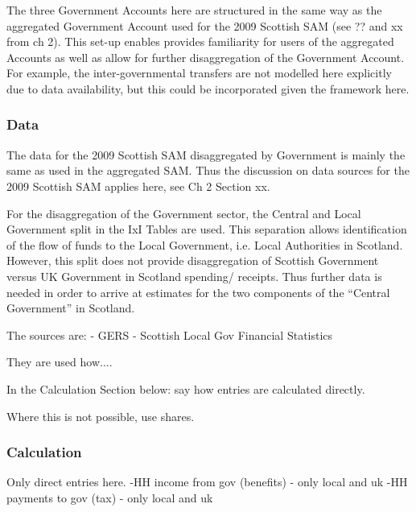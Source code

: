 \bigskip

The three Government Accounts here are structured in the same way as the aggregated Government Account used for the 2009 Scottish SAM (see ?? and xx from ch 2).  This set-up enables provides familiarity for users of the aggregated Accounts as well as allow for further disaggregation of the Government Account. For example, the inter-governmental transfers are not modelled here explicitly due to data availability, but this could be incorporated given the framework here.

\bigskip

\subsubsection{Data}

The data for the 2009 Scottish SAM disaggregated by Government is mainly the same as used in the aggregated SAM. Thus the discussion on data sources for the 2009 Scottish SAM applies here, see Ch 2 Section xx. 

\bigskip

For the disaggregation of the Government sector, the Central and Local Government split in the IxI Tables are used. This separation allows identification of the flow of funds to the Local Government, i.e. Local Authorities in Scotland. However, this split does not provide disaggregation of Scottish Government versus UK Government in Scotland spending/ receipts. Thus further data is needed in order to arrive at estimates for the two components of the ``Central Government'' in Scotland. 

\bigskip

The sources are:
- GERS
- Scottish Local Gov Financial Statistics

They are used how....

In the Calculation Section below: say how entries are calculated directly.

Where this is not possible, use shares. 


\bigskip

\subsubsection{Calculation}

Only direct entries here.
-HH income from gov (benefits) - only local and uk
-HH payments to gov (tax) - only local and uk



\bigskip

